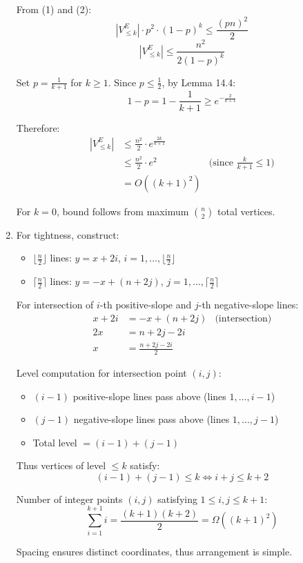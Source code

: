 \documentclass{article}
\begin{document}
\begin{enumerate}[label=(\alph*)]
  From (1) and (2):
  \[|V_{\leq k}^E| \cdot p^2 \cdot (1-p)^k \leq \frac{(pn)^2}{2}\]
  \[|V_{\leq k}^E| \leq \frac{n^2}{2(1-p)^k}\]
  
  Set $p = \frac{1}{k+1}$ for $k \geq 1$. Since $p \leq \frac{1}{2}$, by Lemma 14.4:
  \[1-p = 1-\frac{1}{k+1} \geq e^{-\frac{2}{k+1}}\]
  
  Therefore:
  \begin{align*}
  |V_{\leq k}^E| &\leq \frac{n^2}{2} \cdot e^{\frac{2k}{k+1}} \\
  &\leq \frac{n^2}{2} \cdot e^2 & \text{(since $\frac{k}{k+1} \leq 1$)} \\
  &= O((k+1)^2)
  \end{align*}
  
  For $k = 0$, bound follows from maximum $\binom{n}{2}$ total vertices.

  \item For tightness, construct:
  \begin{itemize}
  \item $\lfloor \frac{n}{2} \rfloor$ lines: $y = x + 2i$, $i = 1,\ldots,\lfloor \frac{n}{2} \rfloor$
  \item $\lceil \frac{n}{2} \rceil$ lines: $y = -x + (n+2j)$, $j = 1,\ldots,\lceil \frac{n}{2} \rceil$
  \end{itemize}
  
  For intersection of $i$-th positive-slope and $j$-th negative-slope lines:
  \begin{align*}
  x + 2i &= -x + (n+2j) & \text{(intersection)} \\
  2x &= n + 2j - 2i \\
  x &= \frac{n+2j-2i}{2}
  \end{align*}
  
  Level computation for intersection point $(i,j)$:
  \begin{itemize}
  \item $(i-1)$ positive-slope lines pass above (lines $1,\ldots,i-1$)
  \item $(j-1)$ negative-slope lines pass above (lines $1,\ldots,j-1$)
  \item Total level $= (i-1) + (j-1)$
  \end{itemize}
  
  Thus vertices of level $\leq k$ satisfy:
  \[(i-1) + (j-1) \leq k \iff i + j \leq k + 2\]
  
  Number of integer points $(i,j)$ satisfying $1 \leq i,j \leq k+1$:
  \[\sum_{i=1}^{k+1} i = \frac{(k+1)(k+2)}{2} = \Omega((k+1)^2)\]
  
  Spacing ensures distinct coordinates, thus arrangement is simple.
  
\end{enumerate}
\end{document}
